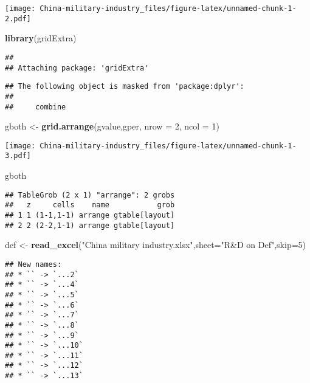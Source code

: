 \documentclass[
]{article}
\newenvironment{Shaded}{\begin{snugshade}}{\end{snugshade}}
\newcommand{\AttributeTok}[1]{\textcolor[rgb]{0.13,0.29,0.53}{#1}}
\newcommand{\DecValTok}[1]{\textcolor[rgb]{0.00,0.00,0.81}{#1}}
\newcommand{\FunctionTok}[1]{\textcolor[rgb]{0.13,0.29,0.53}{\textbf{#1}}}
\newcommand{\NormalTok}[1]{#1}
\newcommand{\OtherTok}[1]{\textcolor[rgb]{0.56,0.35,0.01}{#1}}
\newcommand{\StringTok}[1]{\textcolor[rgb]{0.31,0.60,0.02}{#1}}
\begin{document}
\texttt{[image: China-military-industry\_files/figure-latex/unnamed-chunk-1-2.pdf]}

\begin{Shaded}
\begin{Highlighting}[]
\FunctionTok{library}\NormalTok{(gridExtra)}
\end{Highlighting}
\end{Shaded}

\begin{verbatim}
## 
## Attaching package: 'gridExtra'
\end{verbatim}

\begin{verbatim}
## The following object is masked from 'package:dplyr':
## 
##     combine
\end{verbatim}

\begin{Shaded}
\begin{Highlighting}[]
\NormalTok{gboth }\OtherTok{\textless{}{-}} \FunctionTok{grid.arrange}\NormalTok{(gvalue,gper, }\AttributeTok{nrow =} \DecValTok{2}\NormalTok{, }\AttributeTok{ncol =} \DecValTok{1}\NormalTok{)}
\end{Highlighting}
\end{Shaded}

\texttt{[image: China-military-industry\_files/figure-latex/unnamed-chunk-1-3.pdf]}

\begin{Shaded}
\begin{Highlighting}[]
\NormalTok{gboth}
\end{Highlighting}
\end{Shaded}

\begin{verbatim}
## TableGrob (2 x 1) "arrange": 2 grobs
##   z     cells    name           grob
## 1 1 (1-1,1-1) arrange gtable[layout]
## 2 2 (2-2,1-1) arrange gtable[layout]
\end{verbatim}

\begin{Shaded}
\begin{Highlighting}[]
\NormalTok{def }\OtherTok{\textless{}{-}} \FunctionTok{read\_excel}\NormalTok{(}\StringTok{"China military industry.xlsx"}\NormalTok{,}\AttributeTok{sheet=}\StringTok{"R\&D on Def"}\NormalTok{,}\AttributeTok{skip=}\DecValTok{5}\NormalTok{)}
\end{Highlighting}
\end{Shaded}

\begin{verbatim}
## New names:
## * `` -> `...2`
## * `` -> `...4`
## * `` -> `...5`
## * `` -> `...6`
## * `` -> `...7`
## * `` -> `...8`
## * `` -> `...9`
## * `` -> `...10`
## * `` -> `...11`
## * `` -> `...12`
## * `` -> `...13`
\end{verbatim}
\end{document}
